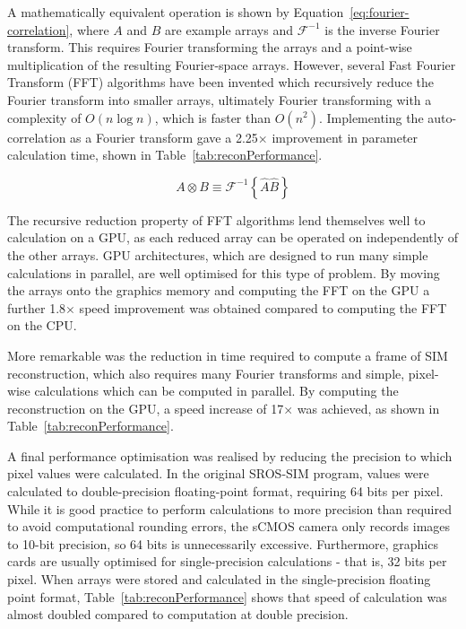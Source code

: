 A mathematically equivalent operation is shown by Equation~\ref{eq:fourier-correlation}, where $A$ and $B$ are example arrays and $\mathcal{F}^{-1}$ is the inverse Fourier transform. 
This requires Fourier transforming the arrays and a point-wise multiplication of the resulting Fourier-space arrays.
However, several Fast Fourier Transform (FFT) algorithms have been invented which recursively reduce the Fourier transform into smaller arrays, ultimately Fourier transforming with a complexity of $O(n\log n)$, which is faster than $O(n^2)$. 
Implementing the auto-correlation as a Fourier transform gave a 2.25$\times$ improvement in parameter calculation time, shown in Table~\ref{tab:reconPerformance}. 

\begin{equation} \label{eq:fourier-correlation}
A \otimes B \equiv \mathcal{F}^{-1}\left\lbrace\hat{A}\hat{B}\right\rbrace
\end{equation}

The recursive reduction property of FFT algorithms lend themselves well to calculation on a GPU, as each reduced array can be operated on independently of the other arrays. 
GPU architectures, which are designed to run many simple calculations in parallel, are well optimised for this type of problem. 
By moving the arrays onto the graphics memory and computing the FFT on the GPU a further 1.8$\times$ speed improvement was obtained compared to computing the FFT on the CPU. 

More remarkable was the reduction in time required to compute a frame of SIM reconstruction, which also requires many Fourier transforms and simple, pixel-wise calculations which can be computed in parallel. 
By computing the reconstruction on the GPU, a speed increase of 17$\times$ was achieved, as shown in Table~\ref{tab:reconPerformance}. 

A final performance optimisation was realised by reducing the precision to which pixel values were calculated. 
In the original SROS-SIM program, values were calculated to double-precision floating-point format, requiring 64 bits per pixel.
While it is good practice to perform calculations to more precision than required to avoid computational rounding errors, the sCMOS camera only records images to 10-bit precision, so 64 bits is unnecessarily excessive.
Furthermore, graphics cards are usually optimised for single-precision calculations - that is, 32 bits per pixel. 
When arrays were stored and calculated in the single-precision floating point format, Table~\ref{tab:reconPerformance} shows that speed of calculation was almost doubled compared to computation at double precision. 

